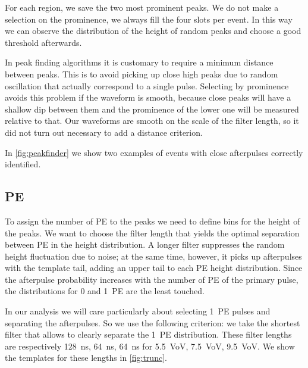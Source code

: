 For each region, we save the two most prominent peaks. We do not make a
selection on the prominence, we always fill the four slots per event. In this
way we can observe the distribution of the height of random peaks and choose
a good threshold afterwards.

In peak finding algorithms it is customary to require a minimum distance
between peaks. This is to avoid picking up close high peaks due to random
oscillation that actually correspond to a single pulse. Selecting by prominence
avoids this problem if the waveform is smooth, because close peaks will have a
shallow dip between them and the prominence of the lower one will be measured
relative to that. Our waveforms are smooth on the scale of the filter length,
so it did not turn out necessary to add a distance criterion.

In \autoref{fig:peakfinder} we show two examples of events with close
afterpulses correctly identified.

\begin{figure}
    
    
    
\end{figure}

\subsection{PE}
\label{sec:pe}

To assign the number of PE to the peaks we need to define bins for the height
of the peaks. We want to choose the filter length that yields the optimal
separation between PE in the height distribution. A longer filter suppresses
the random height fluctuation due to noise; at the same time, however, it picks
up afterpulses with the template tail, adding an upper tail to each PE height
distribution. Since the afterpulse probability increases with the number of PE
of the primary pulse, the distributions for 0 and 1~PE are the least touched.

In our analysis we will care particularly about selecting 1~PE pulses and
separating the afterpulses. So we use the following criterion: we take the
shortest filter that allows to clearly separate the 1~PE distribution. These
filter lengths are respectively \SI{128}{ns}, \SI{64}{ns}, \SI{64}{ns} for
\SI{5.5}{VoV}, \SI{7.5}{VoV}, \SI{9.5}{VoV}. We show the templates for these
lengths in \autoref{fig:trunc}.


